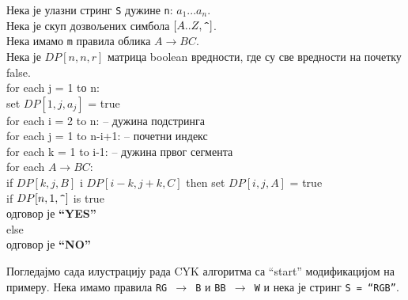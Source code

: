 \documentclass[a4wide]{article}
\begin{document}
\begin{shaded}
\noindent Нека је улазни стринг {\tt S} дужине {\tt n}: $a_1...a_n$.\\
Нека је скуп дозвољених симбола $[A..Z, \verb|^|]$.\\
Нека имамо {\tt m} правила облика $A \to BC$.\\
Нека је $DP[n, n, r]$ матрица boolean вредности, где су све вредности на почетку false.\\
\linebreak
for each j = 1 tо n:\\
\indent set $DP[1, j, a_j]$ = true\\
for each i = 2 to n: -- дужина подстринга\\
\indent for each j = 1 to n-i+1: -- почетни индекс\\
\indent \indent for each k = 1 to i-1: -- дужина првог сегмента\\
\indent \indent \indent for each $A \to BC$:\\
\indent \indent \indent \indent if $DP[k,j,B]$ i $DP[i-k,j+k,C]$ then set $DP[i,j,A]$ = true\\
		  \linebreak
if $DP[n, 1, \verb|^|]$ is true \\
\indent одговор је {\bf ``YES''}\\
else\\
\indent одговор је {\bf ``NO''}\\
\end{shaded}

\noindent Погледајмо сада илустрацију рада CYK алгоритма са ``start'' модификацијом на примеру. Нека имамо правила {\tt RG $\to$ B} и {\tt BB $\to$ W} и нека је стринг {\tt S = ``RGB''}.\\

\pagebreak
\end{document}
